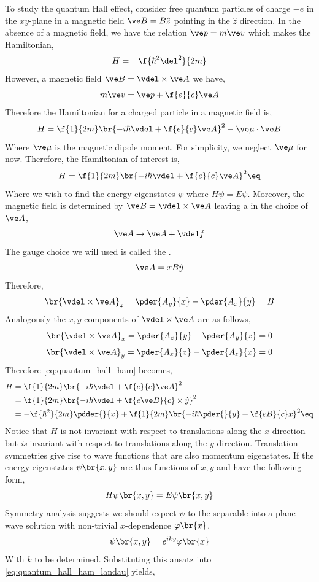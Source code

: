 \documentclass{article}
\begin{document}
To study the quantum Hall effect, consider free quantum particles of charge $-e$ in the $xy$-plane in a magnetic field $\ve B= B \hat z$ pointing in the $\hat z$ direction. In the absence of a magnetic field, we have the relation $\ve p = m \ve v$ which makes the Hamiltonian,
\[  H = - \f{\hbar^2 \del^2}{2m} \]
However, a magnetic field $\ve B = \vdel \times \ve A$ we have,
\[ m \ve v = \ve p + \f{e}{c} \ve A \]
Therefore the Hamiltonian for a charged particle in a magnetic field is,
\[ H = \f{1}{2m} \br{- i \hbar \vdel + \f{e}{c} \ve A}^2 - \ve \mu \cdot \ve B \]
Where $\ve \mu$ is the magnetic dipole moment. For simplicity, we neglect $\ve \mu$ for now. Therefore, the Hamiltonian of interest is,
\[ H = \f{1}{2m} \br{- i \hbar \vdel + \f{e}{c} \ve A}^2 \eq \label{eq:quantum_hall_ham} \]
Where we wish to find the energy eigenstates $\psi$ where $H \psi = E \psi$. Moreover, the magnetic field is determined by $\ve B = \vdel \times \ve A$ leaving a  in the choice of $\ve A$,
\[ \ve A \to \ve A + \vdel f \]
The gauge choice we will used is called the .
\[ \ve A = x B \hat y \]
Therefore,
\[ \br{\vdel \times \ve A}_{z} = \pder{A_y}{x} - \pder{A_x}{y} = B \]
Analogously the $x,y$ components of $\vdel \times \ve A$ are as follows,
\[ \br{\vdel \times \ve A}_{x} = \pder{A_z}{y} - \pder{A_y}{z} = 0 \]
\[ \br{\vdel \times \ve A}_{y} = \pder{A_x}{z} - \pder{A_z}{x} = 0 \]
Therefore \cref{eq:quantum_hall_ham} becomes,
\begin{align*}
    H
    &= \f{1}{2m}\br{- i \hbar \vdel + \f{e}{c} \ve A}^2 \\
    &= \f{1}{2m}\br{- i \hbar \vdel + \f{e\ve B}{c} \times \hat y}^2 \\
    &= - \f{\hbar^2}{2m} \pdder{}{x} + \f{1}{2m}\br{- i \hbar \pder{}{y} + \f{eB}{c}x}^2 \eq \label{eq:quantum_hall_ham_landau}
\end{align*}
Notice that $H$ is not invariant with respect to translations along the $x$-direction but \textit{is} invariant with respect to translations along the $y$-direction. Translation symmetries give rise to wave functions that are also momentum eigenstates. If the energy eigenstates $\psi\br{x,y}$ are thus functions of $x,y$ and have the following form,
\[ H \psi\br{x,y} = E \psi\br{x,y} \]
Symmetry analysis suggests we should expect $\psi$ to the separable into a plane wave solution with non-trivial $x$-dependence $\varphi\br{x}$.
\[ \psi\br{x,y} = e^{i k y} \varphi\br{x} \]
With $k$ to be determined. Substituting this ansatz into \cref{eq:quantum_hall_ham_landau} yields,
\end{document}
